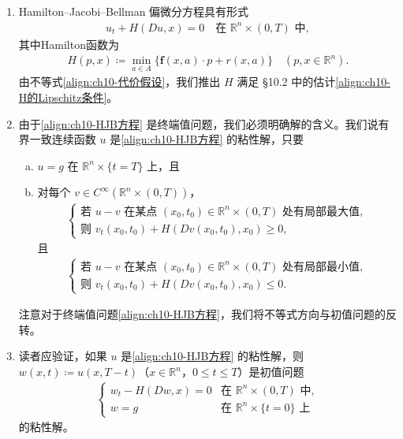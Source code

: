 \documentclass[../../main.tex]{subfiles}
\begin{document}
\begin{remark}
\begin{enumerate}
\item[(i)] Hamilton--Jacobi--Bellman 偏微分方程具有形式
\begin{align*}
u_t+H(Du,x)=0 \quad \text{在 } \mathbb{R}^n\times(0,T) \text{ 中},
\end{align*}
其中Hamilton函数为
\begin{align}
H(p,x)\coloneqq \min_{a\in A}\{\mathbf{f}(x,a)\cdot p+r(x,a)\} \quad (p,x\in\mathbb{R}^n).
\label{align:ch10-HJBHamilton}
\end{align}
由不等式\eqref{align:ch10-代价假设}，我们推出 $H$ 满足 \S10.2 中的估计\eqref{align:ch10-H的Lipschitz条件}。

\item[(ii)] 由于\eqref{align:ch10-HJB方程} 是终端值问题，我们必须明确解的含义。我们说有界一致连续函数 $u$ 是\eqref{align:ch10-HJB方程} 的粘性解，只要
\begin{enumerate}[(a)]
\item $u=g$ 在 $\mathbb{R}^n\times\{t=T\}$ 上，且
\item 对每个 $v\in C^\infty(\mathbb{R}^n\times(0,T))$，
\begin{align}
\begin{cases}
\text{若 } u-v \text{ 在某点 } (x_0,t_0)\in\mathbb{R}^n\times(0,T) \text{ 处有局部最大值},\\
\text{则 } v_t(x_0,t_0)+H(Dv(x_0,t_0),x_0)\geqslant 0,
\end{cases}
\label{align:ch10-HJB上不等式}
\end{align}
且
\begin{align}
\begin{cases}
\text{若 } u-v \text{ 在某点 } (x_0,t_0)\in\mathbb{R}^n\times(0,T) \text{ 处有局部最小值},\\
\text{则 } v_t(x_0,t_0)+H(Dv(x_0,t_0),x_0)\leqslant 0.
\end{cases}
\label{align:ch10-HJB下不等式}
\end{align}
\end{enumerate}
注意对于终端值问题\eqref{align:ch10-HJB方程}，我们将不等式方向与初值问题的反转。

\item[(iii)] 读者应验证，如果 $u$ 是\eqref{align:ch10-HJB方程} 的粘性解，则 $w(x,t)\coloneqq u(x,T-t)$（$x\in\mathbb{R}^n$，$0\leqslant t\leqslant T$）是初值问题
\begin{align*}
\begin{cases}
w_t-H(Dw,x)=0 & \text{在 } \mathbb{R}^n\times(0,T) \text{ 中},\\
w=g & \text{在 } \mathbb{R}^n\times\{t=0\} \text{ 上}
\end{cases}
\end{align*}
的粘性解。
\end{enumerate}
\end{remark}
\end{document}

